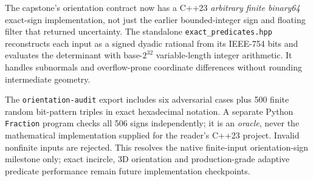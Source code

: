 \begin{booktwoconcept}
The capstone's orientation contract now has a C++23
\emph{arbitrary finite binary64} exact-sign implementation,
not just the earlier bounded-integer sign and floating
filter that returned uncertainty. The standalone
\texttt{exact\_predicates.hpp} reconstructs each input
as a signed dyadic rational from its IEEE-754 bits
and evaluates the determinant with base-\(2^{32}\)
variable-length integer arithmetic. It handles
subnormals and overflow-prone coordinate differences
without rounding intermediate geometry.

The \texttt{orientation-audit} export includes six
adversarial cases plus 500 finite random bit-pattern
triples in exact hexadecimal notation. A separate
Python \texttt{Fraction} program checks all 506 signs
independently; it is an \emph{oracle}, never the
mathematical implementation supplied for the reader's
C++23 project. Invalid nonfinite inputs are rejected.
This resolves the native finite-input orientation-sign
milestone only; exact incircle, 3D orientation and
production-grade adaptive predicate performance remain
future implementation checkpoints.
\end{booktwoconcept}
